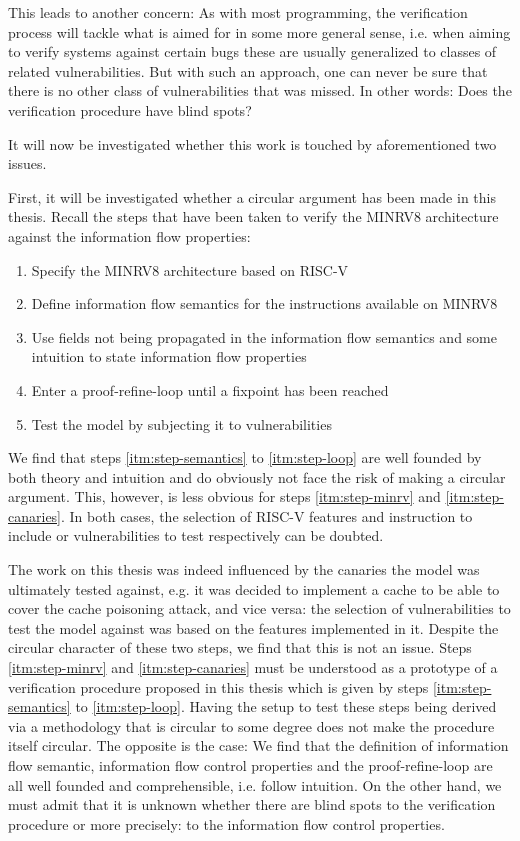 This leads to another concern:
As with most programming, the verification process will tackle what is aimed for in some more general sense, i.e. when aiming to verify systems against certain bugs these are usually generalized to classes of related vulnerabilities.
But with such an approach, one can never be sure that there is no other class of vulnerabilities that was missed.
In other words: Does the verification procedure have blind spots?

It will now be investigated whether this work is touched by aforementioned two issues.

First, it will be investigated whether a circular argument has been made in this thesis.
Recall the steps that have been taken to verify the MINRV8 architecture against the information flow properties:
\begin{enumerate}
    \item \label{itm:step-minrv}
    Specify the MINRV8 architecture based on RISC-V
    \item \label{itm:step-semantics}
    Define information flow semantics for the instructions available on MINRV8
    \item \label{itm:step-properties}
    Use fields not being propagated in the information flow semantics and some intuition to state information flow properties
    \item \label{itm:step-loop}
    Enter a proof-refine-loop until a fixpoint has been reached
    \item \label{itm:step-canaries}
    Test the model by subjecting it to vulnerabilities
\end{enumerate}

We find that steps \ref{itm:step-semantics} to \ref{itm:step-loop} are well founded by both theory and intuition and do obviously not face the risk of making a circular argument.
This, however, is less obvious for steps \ref{itm:step-minrv} and \ref{itm:step-canaries}.
In both cases, the selection of RISC-V features and instruction to include or vulnerabilities to test respectively can be doubted.

The work on this thesis was indeed influenced by the canaries the model was ultimately tested against, e.g. it was decided to implement a cache to be able to cover the cache poisoning attack, and vice versa: the selection of vulnerabilities to test the model against was based on the features implemented in it.
Despite the circular character of these two steps, we find that this is not an issue.
Steps \ref{itm:step-minrv} and \ref{itm:step-canaries} must be understood as a prototype of a verification procedure proposed in this thesis which is given by steps \ref{itm:step-semantics} to \ref{itm:step-loop}.
Having the setup to test these steps being derived via a methodology that is circular to some degree does not make the procedure itself circular.
The opposite is the case:
We find that the definition of information flow semantic, information flow control properties and the proof-refine-loop are all well founded and comprehensible, i.e. follow intuition.
On the other hand, we must admit that it is unknown whether there are blind spots to the verification procedure or more precisely: to the information flow control properties.

